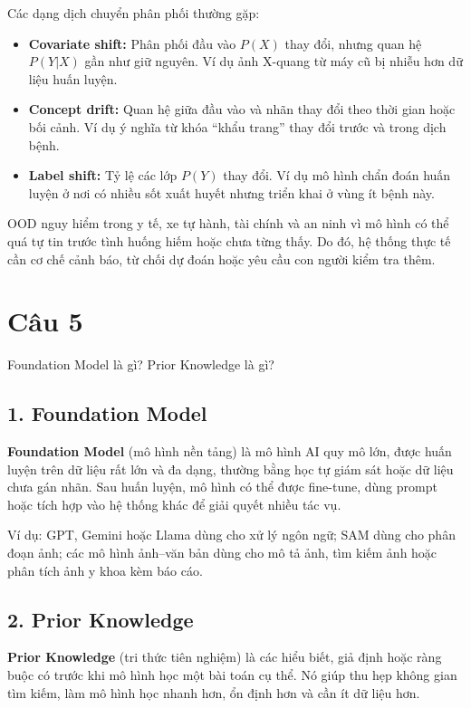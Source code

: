 Các dạng dịch chuyển phân phối thường gặp:
\begin{itemize}
    \item \textbf{Covariate shift:} Phân phối đầu vào $P(X)$ thay đổi, nhưng quan hệ $P(Y|X)$ gần như giữ nguyên. Ví dụ ảnh X-quang từ máy cũ bị nhiễu hơn dữ liệu huấn luyện.
    \item \textbf{Concept drift:} Quan hệ giữa đầu vào và nhãn thay đổi theo thời gian hoặc bối cảnh. Ví dụ ý nghĩa từ khóa ``khẩu trang'' thay đổi trước và trong dịch bệnh.
    \item \textbf{Label shift:} Tỷ lệ các lớp $P(Y)$ thay đổi. Ví dụ mô hình chẩn đoán huấn luyện ở nơi có nhiều sốt xuất huyết nhưng triển khai ở vùng ít bệnh này.
\end{itemize}

OOD nguy hiểm trong y tế, xe tự hành, tài chính và an ninh vì mô hình có thể quá tự tin trước tình huống hiếm hoặc chưa từng thấy. Do đó, hệ thống thực tế cần cơ chế cảnh báo, từ chối dự đoán hoặc yêu cầu con người kiểm tra thêm.

\section*{Câu 5}
Foundation Model là gì? Prior Knowledge là gì?

\subsection*{1. Foundation Model}

\textbf{Foundation Model} (mô hình nền tảng) là mô hình AI quy mô lớn, được huấn luyện trên dữ liệu rất lớn và đa dạng, thường bằng học tự giám sát hoặc dữ liệu chưa gán nhãn. Sau huấn luyện, mô hình có thể được fine-tune, dùng prompt hoặc tích hợp vào hệ thống khác để giải quyết nhiều tác vụ.

Ví dụ: GPT, Gemini hoặc Llama dùng cho xử lý ngôn ngữ; SAM dùng cho phân đoạn ảnh; các mô hình ảnh--văn bản dùng cho mô tả ảnh, tìm kiếm ảnh hoặc phân tích ảnh y khoa kèm báo cáo.

\subsection*{2. Prior Knowledge}

\textbf{Prior Knowledge} (tri thức tiên nghiệm) là các hiểu biết, giả định hoặc ràng buộc có trước khi mô hình học một bài toán cụ thể. Nó giúp thu hẹp không gian tìm kiếm, làm mô hình học nhanh hơn, ổn định hơn và cần ít dữ liệu hơn.

